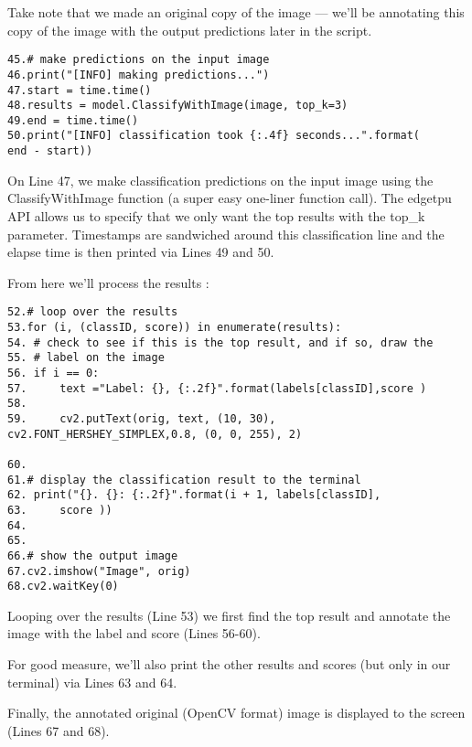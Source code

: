 Take note that we made an original copy  of the image — we’ll be annotating this copy of the image with the output predictions later in the script.\newline
\begin{verbatim}
45.# make predictions on the input image
46.print("[INFO] making predictions...")
47.start = time.time()
48.results = model.ClassifyWithImage(image, top_k=3)
49.end = time.time()
50.print("[INFO] classification took {:.4f} seconds...".format(
end - start))

\end{verbatim}
On Line 47, we make classification predictions on the input image using the ClassifyWithImage  function (a super easy one-liner function call). The edgetpu  API allows us to specify that we only want the top results with the top\_k  parameter.\newline
Timestamps are sandwiched around this classification line and the elapse time is then printed via Lines 49 and 50.\newline

From here we’ll process the results :\newline
\begin{verbatim}
52.# loop over the results
53.for (i, (classID, score)) in enumerate(results):
54.	# check to see if this is the top result, and if so, draw the
55.	# label on the image
56.	if i == 0:
57.		text ="Label: {}, {:.2f}".format(labels[classID],score )
58.			
59.		cv2.putText(orig, text, (10, 30), cv2.FONT_HERSHEY_SIMPLEX,0.8, (0, 0, 255), 2)

60.			
61.# display the classification result to the terminal
62.	print("{}. {}: {:.2f}".format(i + 1, labels[classID],
63.		score ))
64.
65. 
66.# show the output image
67.cv2.imshow("Image", orig)
68.cv2.waitKey(0)

\end{verbatim}
Looping over the results  (Line 53) we first find the top result and annotate the image with the label and  score (Lines 56-60).

For good measure, we’ll also print the other results and scores (but only in our terminal) via Lines 63 and 64.

Finally, the annotated original (OpenCV format) image is displayed to the screen (Lines 67 and 68).

